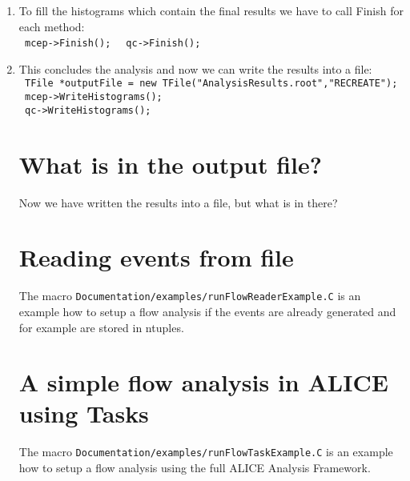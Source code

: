 \begin{enumerate}
\texttt{for(Int\textunderscore t i=0; i<nEvts; i++) \{}\\
\texttt{      // make an event with mult particles }\\
\texttt{      AliFlowEventSimple* event = new AliFlowEventSimple(mult,AliFlowEventSimple::kGenerate);}\\
\texttt{      // modify the tracks adding the flow value v2}\\
\texttt{       event->AddV2(v2);}\\
\texttt{      // select the particles for the reference flow}\\
\texttt{      event->TagRP(cutsRP);}\\
\texttt{      // select the particles for differential flow}\\
\texttt{      event->TagPOI(cutsPOI);}\\
\texttt{      // do flow analysis with various methods:}\\
\texttt{      mcep->Make(event);}\\
\texttt{      qc->Make(event);}\\
\texttt{    \} // end of for(Int\textunderscore t i=0;i<nEvts;i++)}\\
\item
To fill the histograms which contain the final results we have to call Finish for each method:\\
\texttt{ mcep->Finish(); }  \texttt{ qc->Finish(); }\\
\item
This concludes the analysis and now we can write the results into a file:\\
\texttt{ TFile *outputFile = new TFile("AnalysisResults.root","RECREATE");}\\
\texttt{ mcep->WriteHistograms();}\\
\texttt{ qc->WriteHistograms();}\\

\section{What is in the output file?}
Now we have written the results into a file, but what is in there?

\section{Reading events from file}
The macro \texttt{Documentation/examples/runFlowReaderExample.C} is an example how to setup a flow analysis if the events are already generated and
for example are stored in ntuples.
 
\section{A simple flow analysis in ALICE using Tasks}
The macro \texttt{Documentation/examples/runFlowTaskExample.C} is an example how to setup a flow analysis using the full ALICE Analysis Framework.
\end{enumerate}
